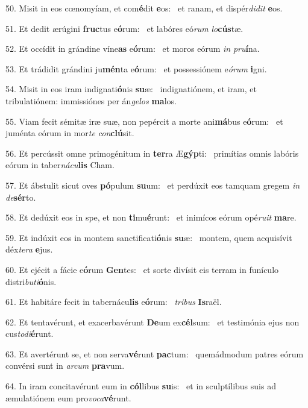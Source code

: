 50. Misit in eos cœnomyíam, et com\textbf{é}dit \textbf{e}os: \ast\  et ranam, et dispér\textit{di}\textit{dit} \textbf{e}os.\

51. Et dedit ærúgini \textbf{fruc}tus e\textbf{ó}rum: \ast\  et labóres eó\textit{rum} \textit{lo}\textbf{cús}tæ.\

52. Et occídit in grándine víne\textbf{as} e\textbf{ó}rum: \ast\  et moros eórum \textit{in} \textit{pru}\textbf{í}na.\

53. Et trádidit grándini ju\textbf{mén}ta e\textbf{ó}rum: \ast\  et possessiónem e\textit{ó}\textit{rum} \textbf{i}gni.\

54. Misit in eos iram indignati\textbf{ó}nis \textbf{su}æ: \ast\  indignatiónem, et iram, et tribulatiónem: immissiónes per án\textit{ge}\textit{los} \textbf{ma}los.\

55. Viam fecit sémitæ iræ suæ, non pepércit a morte ani\textbf{má}bus e\textbf{ó}rum: \ast\  et juménta eórum in mor\textit{te} \textit{con}\textbf{clú}sit.\

56. Et percússit omne primogénitum in \textbf{ter}ra Æ\textbf{gýp}ti: \ast\  primítias omnis labóris eórum in taber\textit{ná}\textit{cu}\textbf{lis} Cham.\

57. Et ábstulit sicut oves \textbf{pó}pulum \textbf{su}um: \ast\  et perdúxit eos tamquam gregem \textit{in} \textit{de}\textbf{sér}to.\

58. Et dedúxit eos in spe, et non \textbf{ti}mu\textbf{é}runt: \ast\  et inimícos eórum opé\textit{ru}\textit{it} \textbf{ma}re.\

59. Et indúxit eos in montem sanctificati\textbf{ó}nis \textbf{su}æ: \ast\  montem, quem acquisívit déx\textit{te}\textit{ra} \textbf{e}jus.\

60. Et ejécit a fácie e\textbf{ó}rum \textbf{Gen}tes: \ast\  et sorte divísit eis terram in funículo distri\textit{bu}\textit{ti}\textbf{ó}nis.\

61. Et habitáre fecit in tabernácu\textbf{lis} e\textbf{ó}rum: \ast\  \textit{tri}\textit{bus} \textbf{Is}raël.\

62. Et tentavérunt, et exacerbavérunt \textbf{De}um ex\textbf{cél}sum: \ast\  et testimónia ejus non cus\textit{to}\textit{di}\textbf{é}runt.\

63. Et avertérunt se, et non serva\textbf{vé}runt \textbf{pac}tum: \ast\  quemádmodum patres eórum convérsi sunt in \textit{ar}\textit{cum} \textbf{pra}vum.\

64. In iram concitavérunt eum in \textbf{cól}libus \textbf{su}is: \ast\  et in sculptílibus suis ad æmulatiónem eum pro\textit{vo}\textit{ca}\textbf{vé}runt.\

